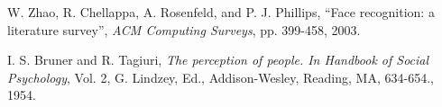  
 
 
\begin{thebibliography}
\small{
 
%
%
 W. Zhao, R. Chellappa, A. Rosenfeld, and P. J. Phillips,
 ``Face recognition: a literature survey'',  \textit{ACM Computing Surveys}, pp. 399-458, 2003.

 I. S. Bruner and R. Tagiuri, 
\textit{The perception of people. In Handbook of Social Psychology}, Vol. 2, G. Lindzey, Ed., Addison-Wesley, Reading, MA, 634-654., 1954. 

 

}

\end{thebibliography}
